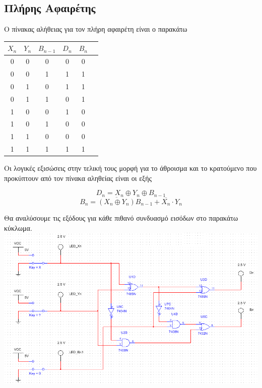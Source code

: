 \documentclass{article}
\begin{document}
\subsection{Πλήρης Αφαιρέτης}

Ο πίνακας αλήθειας για τον πλήρη αφαιρέτη είναι ο παρακάτω

\begin{center}
	\begin{tabular}{|c|c|c|c|c|c|}
	\hline
	$X_n$ & $Y_n$ & $B_{n-1}$ & $D_n$ & $B_n$ \\
	\hline
	0 & 0 & 0 & 0 & 0 \\
	0 & 0 & 1 & 1 & 1 \\
	0 & 1 & 0 & 1 & 1 \\
	0 & 1 & 1 & 0 & 1 \\
	1 & 0 & 0 & 1 & 0 \\
	1 & 0 & 1 & 0 & 0 \\
	1 & 1 & 0 & 0 & 0 \\
	1 & 1 & 1 & 1 & 1 \\
	\hline
\end{tabular}
\end{center}

Οι λογικές εξισώσεις στην τελική τους μορφή για το άθροισμα και το κρατούμενο που
προκύπτουν από τον πίνακα αληθείας είναι οι εξής

\[D_n = X_n \oplus Y_n \oplus B_{n-1}\]
\[B_n = \overline{(X_n \oplus Y_n)}B_{n-1} + \overline{X_n} \cdot Y_n\]

Θα αναλύσουμε τις εξόδους για κάθε πιθανό συνδυασμό εισόδων στο παρακάτω κύκλωμα. \\
\includegraphics[width=\textwidth]{./res/fs000.png}
\end{document}
